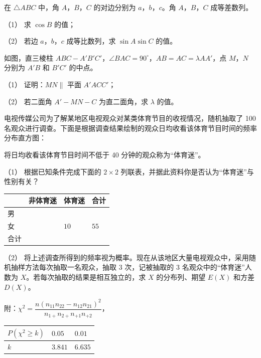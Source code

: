 \begin{question}
在 $\triangle ABC$ 中，角 $A$，$B$，$C$ 的对边分别为 $a$，$b$，$c$。角 $A$，$B$，$C$ 成等差数列。

（1） 求 $\cos B$ 的值；

（2） 若边 $a$，$b$，$c$ 成等比数列，求 $\sin A\sin C$ 的值。

\Needspace{0.4\textheight}
\end{question}
\begin{question}
如图，直三棱柱 $ABC-A'B'C'$，$\angle BAC=90^\circ$，$AB=AC=\lambda AA'$，点 $M$，$N$ 分别为 $A'B$ 和 $B'C'$ 的中点。
\nopagebreak[4]
\begin{center}\end{center}
\nopagebreak[4]
（1） 证明：$MN\parallel$ 平面 $A'ACC'$；

（2） 若二面角 $A'-MN-C$ 为直二面角，求 $\lambda$ 的值。

\Needspace{0.4\textheight}
\end{question}
\begin{question}
电视传媒公司为了解某地区电视观众对某类体育节目的收视情况，随机抽取了 100 名观众进行调查。下面是根据调查结果绘制的观众日均收看该体育节目时间的频率分布直方图：
\nopagebreak[4]
\begin{center}\end{center}
\nopagebreak[4]
将日均收看该体育节目时间不低于 40 分钟的观众称为“体育迷”。

（1） 根据已知条件完成下面的 $2\times2$ 列联表，并据此资料你是否认为“体育迷”与性别有关？

\begin{center}
\begin{tabular}{llll}
\toprule
 & 非体育迷 & 体育迷 & 合计 \\
\midrule
男 &  &  &  \\
女 &  & $10$ & $55$ \\
合计 &  &  &  \\
\bottomrule
\end{tabular}
\end{center}

（2） 将上述调查所得到的频率视为概率。现在从该地区大量电视观众中，采用随机抽样方法每次抽取一名观众，抽取 3 次，记被抽取的 3 名观众中的“体育迷”人数为 $X$。若每次抽取的结果是相互独立的，求 $X$ 的分布列、期望 $E(X)$ 和方差 $D(X)$。

附：$\chi^2=\dfrac{n(n_{11}n_{22}-n_{12}n_{21})^2}{n_{1+}n_{2+}n_{+1}n_{+2}}$，

\begin{center}
\begin{tabular}{lll}
\toprule
$P(\chi^2\geqslant k)$ & $0.05$ & $0.01$ \\
\midrule
$k$ & $3.841$ & $6.635$ \\
\bottomrule
\end{tabular}
\end{center}

\Needspace{0.4\textheight}
\end{question}
